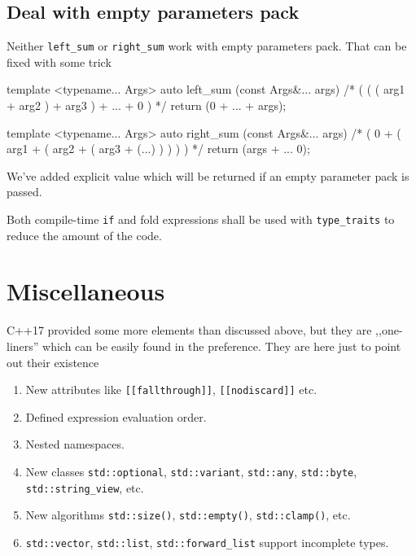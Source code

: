 \documentclass[../main]{subfiles}
\begin{document}
\subsection{Deal with empty parameters pack}
    Neither \texttt{left\_sum} or \texttt{right\_sum} work with empty parameters pack. That can be fixed with some trick
\begin{Code}
    template <typename... Args>
    auto left_sum (const Args&... args)
    {
        /*  ( ( ( arg1 + arg2 ) + arg3 ) + ... + 0 ) */
        return (0 + ... + args);
    }
    
    template <typename... Args>
    auto right_sum (const Args&... args)
    {
        /* ( 0 + ( arg1 + ( arg2 + ( arg3 + (...) ) ) ) ) */
        return (args + ... 0);
    }
\end{Code}
\noindent
We've added explicit value which will be returned if an empty parameter pack is passed.\newline

    Both compile-time \texttt{if} and fold expressions shall be used with \texttt{type\_traits} to reduce the amount of the code.

\section{Miscellaneous}
    C++17 provided some more elements than discussed above, but they are ,,one-liners'' which can be easily found in the preference. They are here just to point out their existence
\begin{enumerate}
    \item New attributes like \texttt{[[fallthrough]]}, \texttt{[[nodiscard]]} etc.
    \item Defined expression evaluation order.
    \item Nested namespaces.
    \item New classes \texttt{std::optional}, \texttt{std::variant}, \texttt{std::any}, \texttt{std::byte},\newline
    \texttt{std::string\_view}, etc.
    \item New algorithms \texttt{std::size()}, \texttt{std::empty()}, \texttt{std::clamp()}, etc.
    \item \texttt{std::vector}, \texttt{std::list}, \texttt{std::forward\_list} support incomplete types.
\end{enumerate}
\end{document}
